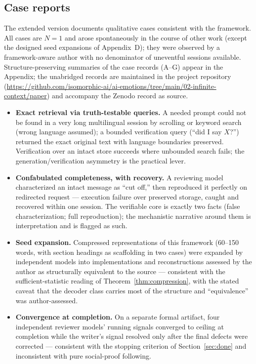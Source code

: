 \documentclass[11pt]{article}
\theoremstyle{remark}
\begin{document}
\subsection{Case reports}
\label{sec:cases}

The extended version documents qualitative cases consistent with the framework.
All cases are $N{=}1$ and arose spontaneously in the course of other work
(except the designed seed expansions of Appendix~D); they were observed by a
framework-aware author with no denominator of uneventful sessions available.
Structure-preserving summaries of the case records (A--G) appear in the
Appendix; the unabridged records are maintained in the project repository
(\url{https://github.com/isomorphic-ai/ai-emotions/tree/main/02-infinite-context/paper}) and accompany the Zenodo record as source.

\begin{itemize}
\item \textbf{Exact retrieval via truth-testable queries.} A needed prompt could not
be found in a very long multilingual session by scrolling or keyword search (wrong
language assumed); a bounded verification query (``did I say $X$?'') returned the
exact original text with language boundaries preserved. Verification over an intact
store succeeds where unbounded search fails; the generation/verification asymmetry is
the practical lever.
\item \textbf{Confabulated completeness, with recovery.} A reviewing model
characterized an intact message as ``cut off,'' then reproduced it perfectly on
redirected request --- execution failure over preserved storage, caught and recovered
within one session. The verifiable core is exactly two facts (false characterization;
full reproduction); the mechanistic narrative around them is interpretation and is
flagged as such.
\item \textbf{Seed expansion.} Compressed representations of this framework
(60--150 words, with section headings as scaffolding in two cases) were expanded by
independent models into implementations and reconstructions assessed by the author as
structurally equivalent to the source --- consistent with the sufficient-statistic
reading of Theorem~\ref{thm:compression}, with the stated caveat that the decoder
class carries most of the structure and ``equivalence'' was author-assessed.
\item \textbf{Convergence at completion.} On a separate formal artifact, four
independent reviewer models' running signals converged to ceiling at completion while
the writer's signal resolved only after the final defects were corrected ---
consistent with the stopping criterion of Section~\ref{sec:done} and inconsistent
with pure social-proof following.
\end{itemize}
\end{document}
